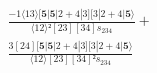 \documentclass[varwidth, border=5pt]{standalone}
\begin{document}
\begin{my}
$\begin{gathered}
\scriptscriptstyle\frac{-1⟨13⟩[𝟓|𝟓|2+4|3][3|2+4|𝟓⟩}{⟨12⟩²[23][34]s_{234}} +\\
\scriptscriptstyle\frac{3[24][𝟓|𝟓|2+4|3][3|2+4|𝟓⟩}{⟨12⟩[23][34]²s_{234}} \phantom{+}
\end{gathered}$
\end{my}
\end{document}
